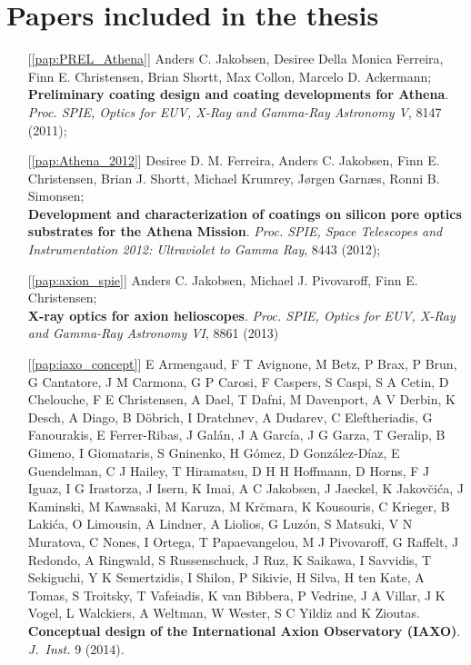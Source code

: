 \chapter{Papers included in the thesis}


\begin{itemize}

\item[{[\ref{pap:PREL_Athena}]}]
Anders C. Jakobsen, Desiree Della Monica Ferreira, Finn E. Christensen, Brian Shortt, Max Collon, Marcelo D. Ackermann;\\
\textbf{Preliminary coating design and coating developments for Athena}. {\em Proc. SPIE, Optics for EUV, X-Ray and Gamma-Ray Astronomy V}, 8147 (2011);

\item[{[\ref{pap:Athena_2012}]}]
Desiree D. M. Ferreira, Anders C. Jakobsen, Finn E. Christensen, Brian J. Shortt, Michael Krumrey, J\o rgen Garn\ae s, Ronni B. Simonsen;\\
\textbf{Development and characterization of coatings on silicon pore optics substrates for the Athena Mission}. {\em Proc. SPIE, Space Telescopes and Instrumentation 2012: Ultraviolet to Gamma Ray}, 8443 (2012);

\item[{[\ref{pap:axion_spie}]}]
Anders C. Jakobsen, Michael J. Pivovaroff, Finn E. Christensen;\\
\textbf{X-ray optics for axion helioscopes}. {\em Proc. SPIE, Optics for EUV, X-Ray and Gamma-Ray Astronomy VI}, 8861 (2013)

\item[{[\ref{pap:iaxo_concept}]}]
E Armengaud, F T Avignone, M Betz, P Brax, P Brun, G Cantatore, J M Carmona, G P Carosi, F Caspers, S Caspi, S A Cetin, D Chelouche, F E Christensen, A Dael, T Dafni, M Davenport, A V Derbin, K Desch, A Diago, B D\"{o}brich, I Dratchnev, A Dudarev, C Eleftheriadis, G Fanourakis, E Ferrer-Ribas, J Gal\'{a}n, J A García, J G Garza, T Geralip, B Gimeno, I Giomataris, S Gninenko, H G\'{o}mez, D Gonz\'{a}lez-D\'{i}az, E Guendelman, C J Hailey, T Hiramatsu, D H H Hoffmann, D Horns, F J Iguaz, I G Irastorza, J Isern, K Imai, A C Jakobsen, J Jaeckel, K Jakov\u{c}i\'{c}a, J Kaminski, M Kawasaki, M Karuza, M Kr\u{c}mara, K Kousouris, C Krieger, B Laki\'{c}a, O Limousin, A Lindner, A Liolios, G Luz\'{o}n, S Matsuki, V N Muratova, C Nones, I Ortega, T Papaevangelou, M J Pivovaroff, G Raffelt, J Redondo, A Ringwald, S Russenschuck, J Ruz, K Saikawa, I Savvidis, T Sekiguchi, Y K Semertzidis, I Shilon, P Sikivie, H Silva, H ten Kate, A Tomas, S Troitsky, T Vafeiadis, K van Bibbera, P Vedrine, J A Villar, J K Vogel, L Walckiers, A Weltman, W Wester, S C Yildiz and K Zioutas.\\
\textbf{Conceptual design of the International Axion Observatory (IAXO)}. {\em J.\ Inst.} 9 (2014).
\end{itemize}


%
